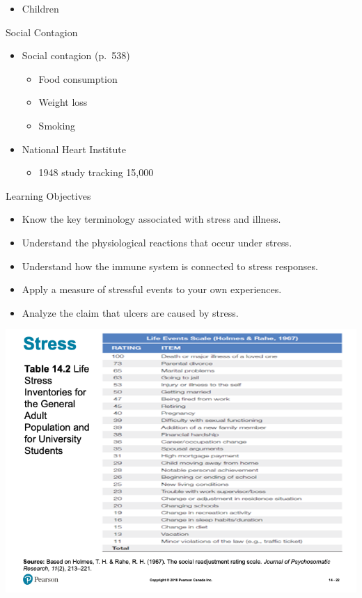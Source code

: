 \documentclass[
]{book}
\providecommand{\tightlist}{%
  \setlength{\itemsep}{0pt}\setlength{\parskip}{0pt}}
\begin{document}
\begin{reflect}
\begin{itemize}
  \begin{itemize}
  \tightlist
  \item
    Children
  \end{itemize}
\end{itemize}

Social Contagion

\begin{itemize}
\tightlist
\item
  Social contagion (p.~538)

  \begin{itemize}
  \tightlist
  \item
    Food consumption\\
  \item
    Weight loss\\
  \item
    Smoking\\
  \end{itemize}
\item
  National Heart Institute

  \begin{itemize}
  \tightlist
  \item
    1948 study tracking 15,000
  \end{itemize}
\end{itemize}

Learning Objectives

\begin{itemize}
\tightlist
\item
  Know the key terminology associated with stress and illness.\\
\item
  Understand the physiological reactions that occur under stress.\\
\item
  Understand how the immune system is connected to stress responses.\\
\item
  Apply a measure of stressful events to your own experiences.\\
\item
  Analyze the claim that ulcers are caused by stress.
\end{itemize}

\includegraphics{assets/unit_8/slide_22.png}


\end{reflect}
\end{document}
